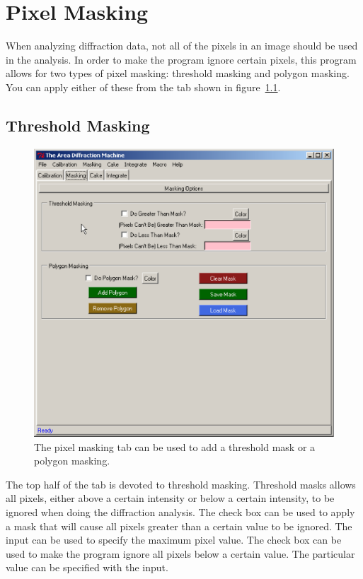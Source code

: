 \chapter{Pixel Masking}\label{pixel_masking}

When analyzing diffraction data, not all of the pixels in 
an image should be used in the analysis. In order to make 
the program ignore certain pixels, 
this program allows for two types of pixel masking:
threshold masking and polygon masking. You can 
apply either of these from the 
 tab shown in  figure~\ref{masking_tab}.

\section{Threshold Masking}

\begin{figure}
    \centering
    \includegraphics[scale=.75]{figures/masking_tab.eps}
    \caption{The pixel masking tab can be used to add
    a threshold mask or a polygon masking.} 
    \label{masking_tab}
\end{figure}

The top half of the  tab is devoted to 
threshold masking. Threshold masks allows all pixels, 
either above a certain intensity or below a certain 
intensity, to be ignored when doing the diffraction 
analysis. The  check box can 
be used to apply a mask that will cause all pixels 
greater than a certain value to be ignored.
The  input 
can be used to specify the maximum pixel value.
The  check box
can be used to make the program ignore all
pixels below a certain value. The particular value can 
be specified with the  input. 

